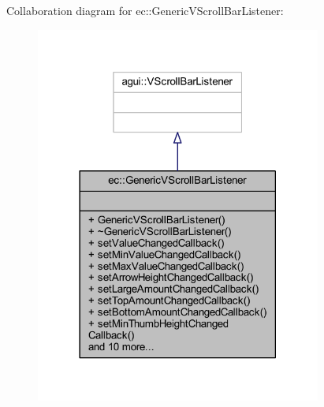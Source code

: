 Collaboration diagram for ec\+:\+:Generic\+V\+Scroll\+Bar\+Listener\+:\nopagebreak
\begin{figure}[H]
\begin{center}
\leavevmode
\includegraphics[width=266pt]{classec_1_1_generic_v_scroll_bar_listener__coll__graph}
\end{center}
\end{figure}

